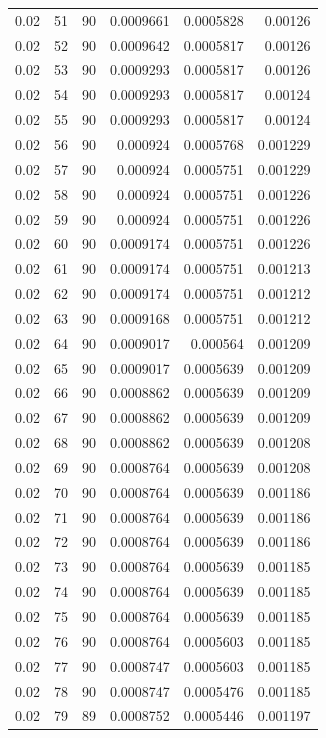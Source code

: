 \begin{tabular}{rrrrrr}
0.02 & 51 & 90 & 0.0009661 & 0.0005828 & 0.00126 \\
0.02 & 52 & 90 & 0.0009642 & 0.0005817 & 0.00126 \\
0.02 & 53 & 90 & 0.0009293 & 0.0005817 & 0.00126 \\
0.02 & 54 & 90 & 0.0009293 & 0.0005817 & 0.00124 \\
0.02 & 55 & 90 & 0.0009293 & 0.0005817 & 0.00124 \\
0.02 & 56 & 90 & 0.000924 & 0.0005768 & 0.001229 \\
0.02 & 57 & 90 & 0.000924 & 0.0005751 & 0.001229 \\
0.02 & 58 & 90 & 0.000924 & 0.0005751 & 0.001226 \\
0.02 & 59 & 90 & 0.000924 & 0.0005751 & 0.001226 \\
0.02 & 60 & 90 & 0.0009174 & 0.0005751 & 0.001226 \\
0.02 & 61 & 90 & 0.0009174 & 0.0005751 & 0.001213 \\
0.02 & 62 & 90 & 0.0009174 & 0.0005751 & 0.001212 \\
0.02 & 63 & 90 & 0.0009168 & 0.0005751 & 0.001212 \\
0.02 & 64 & 90 & 0.0009017 & 0.000564 & 0.001209 \\
0.02 & 65 & 90 & 0.0009017 & 0.0005639 & 0.001209 \\
0.02 & 66 & 90 & 0.0008862 & 0.0005639 & 0.001209 \\
0.02 & 67 & 90 & 0.0008862 & 0.0005639 & 0.001209 \\
0.02 & 68 & 90 & 0.0008862 & 0.0005639 & 0.001208 \\
0.02 & 69 & 90 & 0.0008764 & 0.0005639 & 0.001208 \\
0.02 & 70 & 90 & 0.0008764 & 0.0005639 & 0.001186 \\
0.02 & 71 & 90 & 0.0008764 & 0.0005639 & 0.001186 \\
0.02 & 72 & 90 & 0.0008764 & 0.0005639 & 0.001186 \\
0.02 & 73 & 90 & 0.0008764 & 0.0005639 & 0.001185 \\
0.02 & 74 & 90 & 0.0008764 & 0.0005639 & 0.001185 \\
0.02 & 75 & 90 & 0.0008764 & 0.0005639 & 0.001185 \\
0.02 & 76 & 90 & 0.0008764 & 0.0005603 & 0.001185 \\
0.02 & 77 & 90 & 0.0008747 & 0.0005603 & 0.001185 \\
0.02 & 78 & 90 & 0.0008747 & 0.0005476 & 0.001185 \\
0.02 & 79 & 89 & 0.0008752 & 0.0005446 & 0.001197 \\

\end{tabular}

